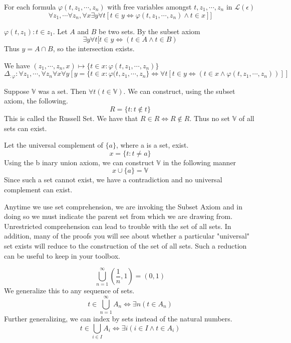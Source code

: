 \begin{axiom}
For each formula $\varphi(t, z_1, \cdots, z_n)$ with free variables amongst $t, z_1, \cdots, z_n$ in $\mathscr{L}(\epsilon)$
\[\forall z_1, \cdots \forall z_n, \forall x \exists y \forall t [t \in y \iff \varphi(t, z_1, \cdots, z_n) \wedge t \in x]]\]
\end{axiom}
\begin{ex}
$\varphi(t, z_1) : t \in z_1$. Let $A$ and $B$ be two sets. By the subset axiom
\[\exists y \forall t[t \in y \iff (t \in A \wedge t \in B)\]
Thus $y = A \cap B$, so the intersection exists.
\end{ex}
\begin{defn}
We have $(z_1, \cdots, z_n, x) \mapsto \{t \in x: \varphi(t, z_1, \cdots, z_n)\}$  
\[\Delta_{: \varphi}: \forall z_1, \cdots, \forall z_n \forall x \forall y[y = \{t \in x: \varphi(t, z_1, \cdots, z_n\} \iff \forall t [t \in y \iff (t \in x \wedge \varphi(t, z_1, \cdots, z_n))]]\]
\end{defn}
\begin{prop}
Suppose $\mathbb{V}$ was a set. Then $\forall t (t \in \mathbb{V})$. We can construct, using the subset axiom, the following.
\[R = \{t : t \notin t\}\]
This is called the Russell Set. We have that $R \in R \iff R \notin R$. Thus no set $\mathbb{V}$ of all sets can exist.
\end{prop}
\begin{prop}
Let the universal complement of $\{a\}$, where a is a set, exist. 
\[x = \{t : t \neq a\}\]
Using the b inary union axiom, we can construct $\mathbb{V}$ in the following manner
\[x \cup \{a\} = \mathbb{V}\]
Since such a set cannot exist, we have a contradiction and no universal complement can exist. 
\end{prop}
\begin{rem}
Anytime we use set comprehension, we are invoking the Subset Axiom and in doing so we must indicate the parent set from which we are drawing from. Unrestricted comprehension can lead to trouble with the set of all sets. In addition, many of the proofs you will see about whether a particular "universal" set exists will reduce to the construction of the set of all sets. Such a reduction can be useful to keep in your toolbox.
\end{rem}
\begin{ex}
\[\bigcup_{n=1}^\infty (\frac{1}{n}, 1) = (0,1)\]
We generalize this to any sequence of sets.
\[t \in \bigcup_{n=1}^\infty A_n \iff \exists n (t \in A_n)\]
Further generalizing, we can index by sets instead of the natural numbers.
\[t \in \bigcup_{i \in I} A_i \iff \exists i (i \in I \wedge t \in A_i)\]
\end{ex}
